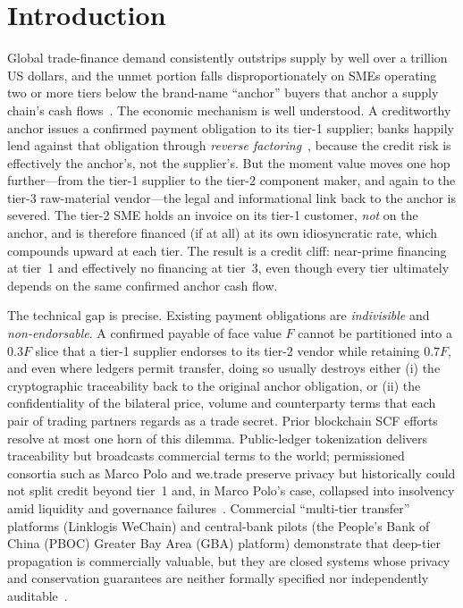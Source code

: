 \documentclass[10pt,twocolumn,letterpaper]{article}
\begin{document}
\section{Introduction}

Global trade-finance demand consistently outstrips supply by well over a trillion
US dollars, and the unmet portion falls disproportionately on SMEs operating two or
more tiers below the brand-name ``anchor'' buyers that anchor a supply chain's cash
flows~\cite{adb2021,bcr2017}. The economic mechanism is well understood. A
creditworthy anchor issues a confirmed payment obligation to its tier-1 supplier;
banks happily lend against that obligation through \emph{reverse
factoring}~\cite{klapper2006,tunca2018}, because the credit risk is effectively the
anchor's, not the supplier's. But the moment value moves one hop further---from the
tier-1 supplier to the tier-2 component maker, and again to the tier-3 raw-material
vendor---the legal and informational link back to the anchor is severed. The
tier-2 SME holds an invoice on its tier-1 customer, \emph{not} on the anchor, and is
therefore financed (if at all) at its own idiosyncratic rate, which compounds
upward at each tier. The result is a credit cliff: near-prime financing at tier~1
and effectively no financing at tier~3, even though every tier ultimately depends on
the same confirmed anchor cash flow.

The technical gap is precise. Existing payment obligations are \emph{indivisible}
and \emph{non-endorsable}. A confirmed payable of face value $F$ cannot be partitioned
into a $0.3F$ slice that a tier-1 supplier endorses to its tier-2 vendor while
retaining $0.7F$, and even where ledgers permit transfer, doing so usually destroys
either (i) the cryptographic traceability back to the original anchor obligation, or
(ii) the confidentiality of the bilateral price, volume and counterparty terms that
each pair of trading partners regards as a trade secret. Prior blockchain SCF
efforts resolve at most one horn of this dilemma. Public-ledger tokenization
delivers traceability but broadcasts commercial terms to the world; permissioned
consortia such as Marco Polo and we.trade preserve privacy but historically could
not split credit beyond tier~1 and, in Marco Polo's case, collapsed into insolvency
amid liquidity and governance failures~\cite{marcopolo2022,wetrade2022}. Commercial
``multi-tier transfer'' platforms (Linklogis WeChain) and central-bank pilots (the
People's Bank of China (PBOC) Greater Bay Area (GBA) platform) demonstrate that deep-tier
propagation is commercially valuable, but they are closed systems whose privacy and
conservation guarantees are neither formally specified nor independently
auditable~\cite{linklogis2021,pboc2020}.
\end{document}
